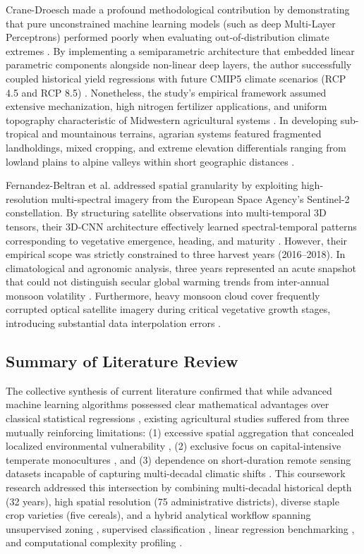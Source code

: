 \documentclass[conference]{IEEEtran}
\begin{document}
Crane-Droesch \cite{crane2018} made a profound methodological contribution by demonstrating that pure unconstrained machine learning models (such as deep Multi-Layer Perceptrons) performed poorly when evaluating out-of-distribution climate extremes \cite{schlenker2009}. By implementing a semiparametric architecture that embedded linear parametric components alongside non-linear deep layers, the author successfully coupled historical yield regressions with future CMIP5 climate scenarios (RCP 4.5 and RCP 8.5) \cite{crane2018}. Nonetheless, the study's empirical framework assumed extensive mechanization, high nitrogen fertilizer applications, and uniform topography characteristic of Midwestern agricultural systems \cite{crane2018}. In developing sub-tropical and mountainous terrains, agrarian systems featured fragmented landholdings, mixed cropping, and extreme elevation differentials ranging from lowland plains to alpine valleys within short geographic distances \cite{dhakal2023, fernandez2021}.

Fernandez-Beltran et al. \cite{fernandez2021} addressed spatial granularity by exploiting high-resolution multi-spectral imagery from the European Space Agency's Sentinel-2 constellation. By structuring satellite observations into multi-temporal 3D tensors, their 3D-CNN architecture effectively learned spectral-temporal patterns corresponding to vegetative emergence, heading, and maturity \cite{fernandez2021}. However, their empirical scope was strictly constrained to three harvest years (2016--2018). In climatological and agronomic analysis, three years represented an acute snapshot that could not distinguish secular global warming trends from inter-annual monsoon volatility \cite{lobell2008, schlenker2009}. Furthermore, heavy monsoon cloud cover frequently corrupted optical satellite imagery during critical vegetative growth stages, introducing substantial data interpolation errors \cite{fernandez2021}.

\subsection{Summary of Literature Review}
The collective synthesis of current literature confirmed that while advanced machine learning algorithms possessed clear mathematical advantages over classical statistical regressions \cite{breiman2001, cortes1995, hastie2009}, existing agricultural studies suffered from three mutually reinforcing limitations: (1) excessive spatial aggregation that concealed localized environmental vulnerability \cite{dhakal2023}, (2) exclusive focus on capital-intensive temperate monocultures \cite{crane2018}, and (3) dependence on short-duration remote sensing datasets incapable of capturing multi-decadal climatic shifts \cite{fernandez2021}. This coursework research addressed this intersection by combining multi-decadal historical depth (32 years), high spatial resolution (75 administrative districts), diverse staple crop varieties (five cereals), and a hybrid analytical workflow spanning unsupervised zoning \cite{macqueen1967, hotelling1933}, supervised classification \cite{breiman2001, cortes1995, quinlan1986}, linear regression benchmarking \cite{hoerl1970}, and computational complexity profiling \cite{hastie2009}.
\end{document}
